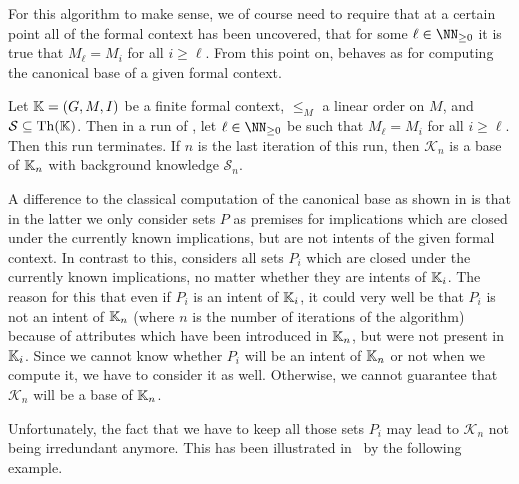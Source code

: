 For this algorithm to make sense, we of course need to require that at a certain point all
of the formal context has been uncovered, \ie that for some $\ell \in \NN_{\geq 0}$ it is
true that $M_{\ell} = M_{i}$ for all $i \geq \ell$.  From this point on,
 behaves as  for
computing the canonical base of a given formal context.

\begin{Theorem}
  \label{thm:base-with-growing-set-of-attributes}
  Let ${\mathbb{K}} = (G, M, I)$ be a finite formal context, $\leq_{M}$ a linear order on $M$,
  and $\mathcal{S} \subseteq \operatorname{Th}({\mathbb{K}})$.  Then in a run of
  , let $\ell \in \NN_{\ge 0}$ be such that
  $M_{\ell} = M_{i}$ for all $i \geq \ell$.  Then this run terminates.  If $n$ is the last
  iteration of this run, then $\mathcal{K}_{n}$ is a base of ${\mathbb{K}}_{n}$ with background
  knowledge $\mathcal{S}_{n}$.
\end{Theorem}

A difference to the classical computation of the canonical base as shown in
 is that in the latter we only consider sets $P$ as premises for
implications which are closed under the currently known implications, but are not intents
of the given formal context.  In contrast to this,
 considers all sets $P_{i}$ which are closed
under the currently known implications, no matter whether they are intents of ${\mathbb{K}}_{i}$.  The reason for this that even if $P_{i}$ is an intent of ${\mathbb{K}}_{i}$, it could
very well be that $P_{i}$ is not an intent of ${\mathbb{K}}_{n}$ (where $n$ is the number of
iterations of the algorithm) because of attributes which have been introduced in ${\mathbb{K}}_{n}$, but were not present in ${\mathbb{K}}_{i}$.  Since we cannot know whether $P_{i}$ will
be an intent of ${\mathbb{K}}_{n}$ or not when we compute it, we have to consider it as well.
Otherwise, we cannot guarantee that $\mathcal{K}_{n}$ will be a base of ${\mathbb{K}}_{n}$.

Unfortunately, the fact that we have to keep all those sets $P_{i}$ may lead to
$\mathcal{K}_{n}$ not being irredundant anymore.  This has been illustrated
in~\cite{Diss-Felix} by the following example.

